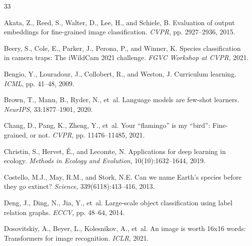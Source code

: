 \documentclass[11pt,a4paper]{article}
\begin{document}



\begin{thebibliography}{33}

Akata, Z., Reed, S., Walter, D., Lee, H., and Schiele, B.
\newblock Evaluation of output embeddings for fine-grained image classification.
\newblock \emph{CVPR}, pp. 2927--2936, 2015.

Beery, S., Cole, E., Parker, J., Perona, P., and Winner, K.
\newblock Species classification in camera traps: The iWildCam 2021 challenge.
\newblock \emph{FGVC Workshop at CVPR}, 2021.

Bengio, Y., Louradour, J., Collobert, R., and Weston, J.
\newblock Curriculum learning.
\newblock \emph{ICML}, pp. 41--48, 2009.

Brown, T., Mann, B., Ryder, N., et~al.
\newblock Language models are few-shot learners.
\newblock \emph{NeurIPS}, 33:1877--1901, 2020.

Chang, D., Pang, K., Zheng, Y., et~al.
\newblock Your ``flamingo'' is my ``bird'': Fine-grained, or not.
\newblock \emph{CVPR}, pp. 11476--11485, 2021.

Christin, S., Hervet, {\'E}., and Lecomte, N.
\newblock Applications for deep learning in ecology.
\newblock \emph{Methods in Ecology and Evolution}, 10(10):1632--1644, 2019.

Costello, M.J., May, R.M., and Stork, N.E.
\newblock Can we name Earth's species before they go extinct?
\newblock \emph{Science}, 339(6118):413--416, 2013.

Deng, J., Ding, N., Jia, Y., et~al.
\newblock Large-scale object classification using label relation graphs.
\newblock \emph{ECCV}, pp. 48--64, 2014.

Dosovitskiy, A., Beyer, L., Kolesnikov, A., et~al.
\newblock An image is worth 16x16 words: Transformers for image recognition.
\newblock \emph{ICLR}, 2021.


\end{thebibliography}
\end{document}
